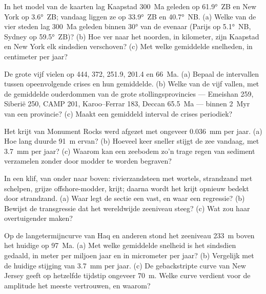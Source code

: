 \begin{exercise}[$\star$]\label{exo:b2:phanerozoic-earth:1}
In het model van de kaarten lag Kaapstad \qty{300}{Ma} geleden op \ang{61.9}~ZB en New York op
\ang{3.6}~ZB; vandaag liggen ze op \ang{33.9}~ZB en \ang{40.7}~NB. (a) Welke van de vier steden lag
\qty{300}{Ma} geleden binnen \ang{30} van de evenaar (Parijs op \ang{5.1}~NB, Sydney op
\ang{59.5}~ZB)? (b) Hoe ver naar het noorden, in kilometer, zijn Kaapstad en New York elk sindsdien verschoven?
(c) Met welke gemiddelde snelheden, in centimeter per jaar?
\end{exercise}

\begin{exercise}[$\star$]\label{exo:b2:phanerozoic-earth:2}
De grote vijf vielen op 444, 372, 251.9, 201.4 en \qty{66}{Ma}. (a) Bepaal de intervallen tussen
opeenvolgende crises en hun gemiddelde. (b) Welke van de vijf vallen, met de gemiddelde ouderdommen van de grote stollingsprovincies ---
Emeishan 259, Siberië 250, CAMP 201, Karoo--Ferrar 183, Deccan \qty{65.5}{Ma} --- binnen \qty{2}{Myr} van een provincie?
(c) Maakt een gemiddeld interval de crises periodiek?
\end{exercise}

\begin{exercise}[$\star$]\label{exo:b2:phanerozoic-earth:3}
Het krijt van Monument Rocks werd afgezet met ongeveer \qty{0.036}{mm} per jaar. (a) Hoe lang duurde
\qty{91}{m} ervan? (b) Hoeveel keer sneller stijgt de zee vandaag, met \qty{3.7}{mm} per
jaar? (c) Waarom kan een zeebodem zo'n trage regen van sediment verzamelen zonder door modder te worden begraven?
\end{exercise}

\begin{exercise}[$\star$]\label{exo:b2:phanerozoic-earth:4}
In een klif, van onder naar boven: rivierzandsteen met wortels, strandzand met schelpen, grijze offshore-modder,
krijt; daarna wordt het krijt opnieuw bedekt door strandzand. (a) Waar legt de sectie een
 vast, en waar een regressie? (b) Bewijst de transgressie dat het wereldwijde
zeeniveau steeg? (c) Wat zou haar overtuigender maken?
\end{exercise}

\begin{exercise}[$\star\star$]\label{exo:b2:phanerozoic-earth:5}
Op de langetermijncurve van Haq en anderen stond het zeeniveau \qty{233}{m} boven het huidige op
\qty{97}{Ma}. (a) Met welke gemiddelde snelheid is het sindsdien gedaald, in meter per miljoen jaar en in
micrometer per jaar? (b) Vergelijk met de huidige stijging van \qty{3.7}{mm} per jaar. (c) De gebackstripte
curve van New Jersey geeft op hetzelfde tijdstip ongeveer \qty{70}{m}. Welke curve verdient voor de
amplitude het meeste vertrouwen, en waarom?
\end{exercise}

